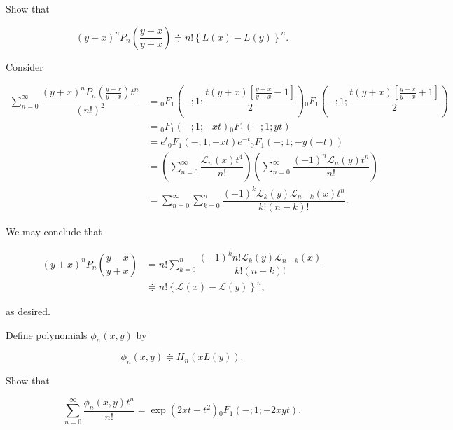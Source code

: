 \begin{problem}\label{problem11chapter15}
Show that

$$(y+x)^n P_n \left( \dfrac{y-x}{y+x} \right) \doteqdot n! \left\{ L(x) - L(y) \right\}^n.$$
\end{problem}
\begin{solution}
Consider

$$\begin{array}{ll}
\displaystyle\sum_{n=0}^{\infty} \dfrac{(y+x)^n P_n(\frac{y-x}{y+x})t^n}{(n!)^2} &= {}_0F_1 \left( -;1;\dfrac{t(y+x)[\frac{y-x}{y+x}-1]}{2} \right) {}_0F_1 \left(-;1; \dfrac{t(y+x)[\frac{y-x}{y+x}+1]}{2} \right) \\
&= {}_0F_1(-;1;-xt) {}_0F_1(-;1;yt) \\
&= e^t {}_0F_1(-;1;-xt) e^{-t} {}_0F_1(-;1;-y(-t)) \\
&= \left( \displaystyle\sum_{n=0}^{\infty} \dfrac{\mathscr{L}_n(x) t^4}{n!} \right) \left( \displaystyle\sum_{n=0}^{\infty} \dfrac{(-1)^n \mathscr{L}_n(y) t^n}{n!} \right) \\
&= \displaystyle\sum_{n=0}^{\infty} \displaystyle\sum_{k=0}^n \dfrac{(-1)^k \mathscr{L}_k(y) \mathscr{L}_{n-k}(x) t^n}{k! (n-k)!}.
\end{array}$$

We may conclude that

$$\begin{array}{ll}
(y+x)^n P_n \left( \dfrac{y-x}{y+x} \right) &= n! \displaystyle\sum_{k=0}^n \dfrac{(-1)^k n! \mathscr{L}_k(y) \mathscr{L}_{n-k}(x)}{k! (n-k)!} \\
&\doteqdot n! \left\{ \mathscr{L}(x) - \mathscr{L}(y) \right\}^n,
\end{array}$$

as desired.
\end{solution}
\begin{problem}\label{problem12chapter15}
Define polynomials $\phi_n(x,y)$ by

$$\phi_n(x,y) \doteqdot H_n \left(xL(y) \right).$$

Show that

$$\displaystyle\sum_{n=0}^{\infty} \dfrac{\phi_n(x,y)t^n}{n!} = \exp(2xt-t^2) {}_0F_1(-;1;-2xyt).$$
\end{problem}

